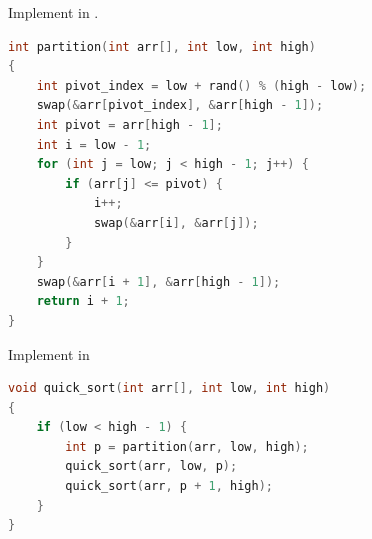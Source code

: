 \begin{question_with_subs}{}
\begin{subq}{Implement  in .}
\begin{lstlisting}[language=C, style=C]
int partition(int arr[], int low, int high)
{
	int pivot_index = low + rand() % (high - low);
    swap(&arr[pivot_index], &arr[high - 1]);
    int pivot = arr[high - 1];
    int i = low - 1;
    for (int j = low; j < high - 1; j++) {
        if (arr[j] <= pivot) {
            i++;
            swap(&arr[i], &arr[j]);
        }
    }
    swap(&arr[i + 1], &arr[high - 1]);
    return i + 1;
}
\end{lstlisting}
\end{subq}

\begin{subq}{Implement  in }
\begin{lstlisting}[language=C, style=C]
void quick_sort(int arr[], int low, int high)
{
    if (low < high - 1) {
        int p = partition(arr, low, high);
        quick_sort(arr, low, p);
        quick_sort(arr, p + 1, high);
    }
}
\end{lstlisting}
\end{subq}
\end{question_with_subs}


\newpage

